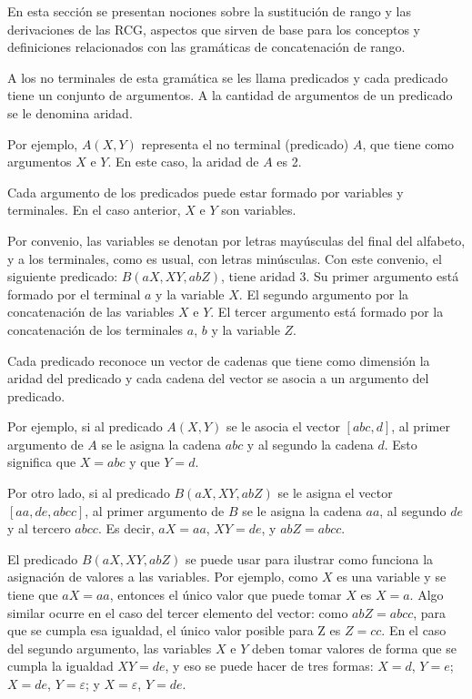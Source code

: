 \documentclass[12pt]{article}
\begin{document}
En esta sección se presentan nociones sobre la sustitución de rango y las derivaciones de las RCG, aspectos 
que sirven de base para los conceptos y definiciones relacionados con las gramáticas de concatenación de rango.

A los no terminales de esta gramática se les llama predicados y cada predicado tiene un conjunto de argumentos. 
A la cantidad de argumentos de un predicado se le denomina aridad.

Por ejemplo, $A(X,Y)$ representa el no terminal (predicado) $A$, que tiene como argumentos $X$ e $Y$. En este caso, la aridad de $A$ es 2.

Cada argumento de los predicados puede estar formado por variables y terminales. En el caso anterior, $X$ e $Y$ son variables.

Por convenio, las variables se denotan por letras mayúsculas del final del alfabeto, y a los terminales, como es 
usual, con letras minúsculas. Con este convenio, el siguiente predicado: $B(aX, XY, abZ)$, tiene aridad 3. Su 
primer argumento está formado por el terminal $a$ y la variable $X$. El segundo argumento por la concatenación 
de las variables $X$ e $Y$. El tercer argumento está formado por la concatenación de los terminales $a$, $b$ y 
la variable $Z$. 

Cada predicado reconoce un vector de cadenas que tiene como dimensión la aridad del predicado y cada cadena del vector se asocia a un argumento del predicado.

Por ejemplo, si al predicado $A(X,Y)$ se le asocia el vector $[abc,d]$, al primer argumento de $A$ se le asigna
la cadena $abc$ y al segundo la cadena $d$. Esto significa que $X=abc$ y que $Y=d$.

Por otro lado, si al predicado $B(aX, XY, abZ)$ se le asigna el vector $[aa,de,abcc]$,
al primer argumento de $B$ se le asigna la cadena $aa$, al segundo $de$ y al tercero $abcc$. Es decir, $aX=aa$, $XY=de$, y $abZ=abcc$.

El predicado $B(aX, XY, abZ)$ se puede usar para ilustrar como funciona la asignación de valores a las variables.
Por ejemplo, como $X$ es una variable y se tiene que $aX=aa$, entonces el único valor que puede tomar $X$ es $X=a$. 
Algo similar ocurre en el caso del tercer elemento del vector: como $abZ=abcc$, para que se cumpla esa igualdad, 
el único valor posible para Z es $Z=cc$. En el caso del segundo argumento, las variables $X$ e $Y$ deben tomar valores 
de forma que se cumpla la igualdad $XY=de$, y eso se puede hacer de tres formas: $X=d$, $Y=e$; $X=de$, $Y=\varepsilon$; 
y $X=\varepsilon$, $Y=de$. 
\end{document}
